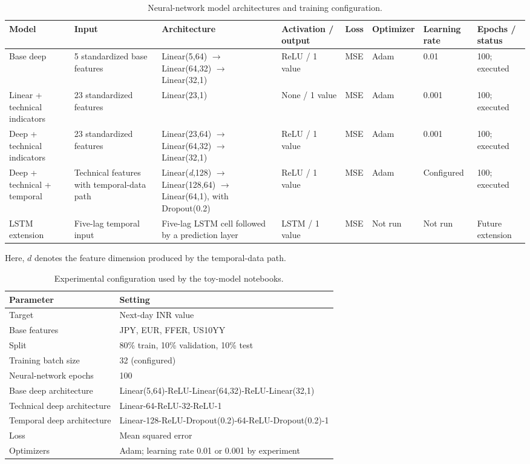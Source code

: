 \begin{table}[h!]
\centering
\caption{Neural-network model architectures and training configuration.}
\label{tab:neural-model-architectures}
\scriptsize
\setlength{\tabcolsep}{3pt}
\renewcommand{\arraystretch}{1.25}
\begin{tabularx}{\textwidth}{@{}L{2.05cm}Y L{3.35cm}L{1.25cm}L{1.7cm}L{1.25cm}L{1.25cm}L{1.7cm}@{}}
\toprule
\textbf{Model} & \textbf{Input} & \textbf{Architecture} & \textbf{Activation / output} & \textbf{Loss} & \textbf{Optimizer} & \textbf{Learning rate} & \textbf{Epochs / status} \\
\midrule
Base deep & 5 standardized base features & Linear(5,64) $\rightarrow$ Linear(64,32) $\rightarrow$ Linear(32,1) & ReLU / 1 value & MSE & Adam & 0.01 & 100; executed \\
Linear + technical indicators & 23 standardized features & Linear(23,1) & None / 1 value & MSE & Adam & 0.001 & 100; executed \\
Deep + technical indicators & 23 standardized features & Linear(23,64) $\rightarrow$ Linear(64,32) $\rightarrow$ Linear(32,1) & ReLU / 1 value & MSE & Adam & 0.001 & 100; executed \\
Deep + technical + temporal & Technical features with temporal-data path & Linear(\textit{d},128) $\rightarrow$ Linear(128,64) $\rightarrow$ Linear(64,1), with Dropout(0.2) & ReLU / 1 value & MSE & Adam & Configured & 100; executed \\
LSTM extension & Five-lag temporal input & Five-lag LSTM cell followed by a prediction layer & LSTM / 1 value & MSE & Not run & Not run & Future extension \\
\bottomrule
\end{tabularx}
\end{table}

Here, $d$ denotes the feature dimension produced by the temporal-data path.

\begin{table}[h!]
\centering
\caption{Experimental configuration used by the toy-model notebooks.}
\label{tab:toy-parameters}
\begin{tabular}{ll}
\toprule
\textbf{Parameter} & \textbf{Setting} \\
\midrule
Target & Next-day INR value \\
Base features & JPY, EUR, FFER, US10YY \\
Split & 80\% train, 10\% validation, 10\% test \\
Training batch size & 32 (configured) \\
Neural-network epochs & 100 \\
Base deep architecture & Linear(5,64)-ReLU-Linear(64,32)-ReLU-Linear(32,1) \\
Technical deep architecture & Linear-64-ReLU-32-ReLU-1 \\
Temporal deep architecture & Linear-128-ReLU-Dropout(0.2)-64-ReLU-Dropout(0.2)-1 \\
Loss & Mean squared error \\
Optimizers & Adam; learning rate 0.01 or 0.001 by experiment \\
\bottomrule
\end{tabular}
\end{table}

